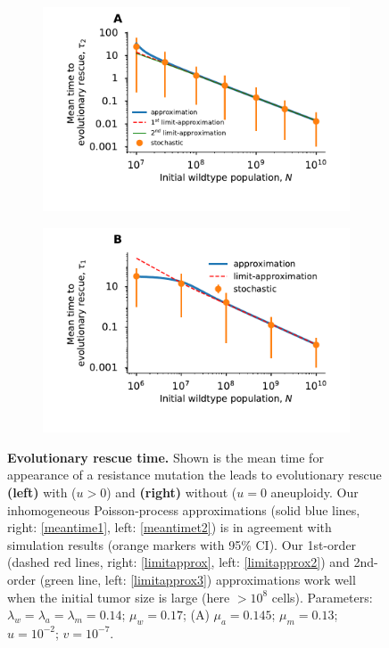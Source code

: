 \documentclass[12pt]{extarticle}
\begin{document}
\begin{figure}
\begin{subfigure}{0.5\textwidth}
\includegraphics[width=1\textwidth]{Figures/MeanTimeDeleteriousPlot.pdf}
\end{subfigure}
\begin{subfigure}{0.5\textwidth}
\includegraphics[width=1\textwidth]{Figures/MeanTimeGrowthMutantDirectPlot.pdf}
\end{subfigure}
\caption{\textbf{Evolutionary rescue time.}
Shown is the mean time for appearance of a resistance mutation the leads to evolutionary rescue \textbf{(left)} with ($u>0$) and \textbf{(right)} without ($u=0$ aneuploidy.
Our inhomogeneous Poisson-process approximations (solid blue lines, right: \cref{meantime1}, left: \cref{meantimet2}) is in agreement with simulation results (orange markers with 95\% CI).
Our 1st-order (dashed red lines, right: \cref{limitapprox}, left: \cref{limitapprox2}) and 2nd-order (green line, left: \cref{limitapprox3}) approximations work well when the initial tumor size is large (here $>10^8$ cells).
Parameters: $\lambda_w=\lambda_a=\lambda_m=0.14$; $\mu_w=0.17$; (A) $\mu_a=0.145$; $\mu_m=0.13$; $u=10^{-2}$; $v=10^{-7}$.
}
\label{MeanTimeGrowthAneuploidyPlot} 
\end{figure}
\end{document}
